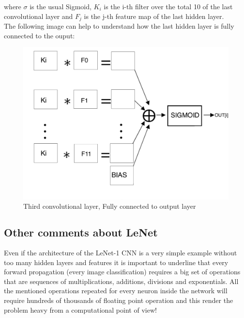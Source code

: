 \documentclass[a4paper]{report}
\begin{document}
 where \( \sigma \) is the usual Sigmoid, \( K_{i} \) is the i-th filter over the total 10 of the last convolutional layer and  \( F_{j} \) is the j-th feature map of the last hidden layer.\\
The following image can help to understand how the last hidden layer is fully connected to the ouput:

\begin{figure}[!h]
\centering
\includegraphics[scale=0.7]{docs/c3.png} 
\caption{Third convolutional layer, Fully connected to output layer}
\label{fig_c3}
\end{figure}

\subsection{Other comments about LeNet}
Even if the architecture of the LeNet-1 CNN is a very simple example without too many hidden layers and features it is important to underline that every forward propagation (every image classification) requires a big set of operations that are sequences of multiplications, additions, divisions and exponentials.
All the mentioned operations repeated for every neuron inside the network will require hundreds of thousands of floating point operation and this render the problem heavy from a computational point of view!
\end{document}
